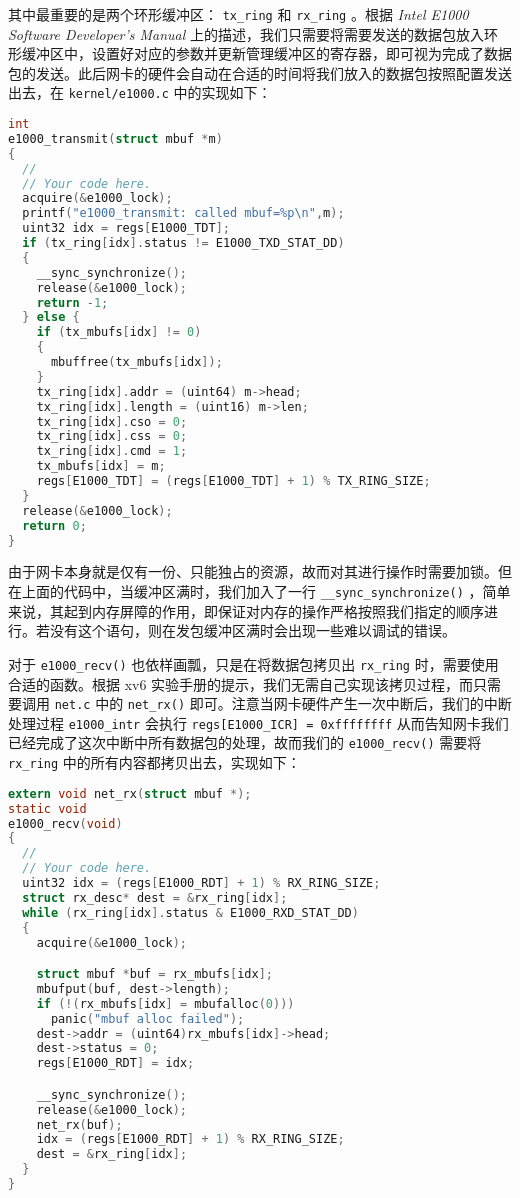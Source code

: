 其中最重要的是两个环形缓冲区： \lstinline{tx_ring} 和 \lstinline{rx_ring} 。根据 \textit{Intel E1000 Software Developer's Manual} 上的描述，我们只需要将需要发送的数据包放入环形缓冲区中，设置好对应的参数并更新管理缓冲区的寄存器，即可视为完成了数据包的发送。此后网卡的硬件会自动在合适的时间将我们放入的数据包按照配置发送出去，在 \lstinline{kernel/e1000.c} 中的实现如下：
\begin{lstlisting}[language=C]
int
e1000_transmit(struct mbuf *m)
{
  //
  // Your code here.
  acquire(&e1000_lock);
  printf("e1000_transmit: called mbuf=%p\n",m);
  uint32 idx = regs[E1000_TDT]; 
  if (tx_ring[idx].status != E1000_TXD_STAT_DD)
  {
    __sync_synchronize();
    release(&e1000_lock);
    return -1;
  } else {
    if (tx_mbufs[idx] != 0)
    {
      mbuffree(tx_mbufs[idx]);
    }
    tx_ring[idx].addr = (uint64) m->head;
    tx_ring[idx].length = (uint16) m->len;
    tx_ring[idx].cso = 0;
    tx_ring[idx].css = 0;
    tx_ring[idx].cmd = 1;
    tx_mbufs[idx] = m;
    regs[E1000_TDT] = (regs[E1000_TDT] + 1) % TX_RING_SIZE;
  }
  release(&e1000_lock);
  return 0;
}
\end{lstlisting}

\begin{theorem}
    由于网卡本身就是仅有一份、只能独占的资源，故而对其进行操作时需要加锁。但在上面的代码中，当缓冲区满时，我们加入了一行 \lstinline{__sync_synchronize()} ，简单来说，其起到内存屏障的作用，即保证对内存的操作严格按照我们指定的顺序进行。若没有这个语句，则在发包缓冲区满时会出现一些难以调试的错误。
\end{theorem}

对于 \lstinline{e1000_recv()} 也依样画瓢，只是在将数据包拷贝出 \lstinline{rx_ring} 时，需要使用合适的函数。根据 xv6 实验手册的提示，我们无需自己实现该拷贝过程，而只需要调用 \lstinline{net.c} 中的 \lstinline{net_rx()} 即可。注意当网卡硬件产生一次中断后，我们的中断处理过程 \lstinline{e1000_intr} 会执行 \lstinline{regs[E1000_ICR] = 0xffffffff} 从而告知网卡我们已经完成了这次中断中所有数据包的处理，故而我们的 \lstinline{e1000_recv()} 需要将 \lstinline{rx_ring} 中的所有内容都拷贝出去，实现如下：
\begin{lstlisting}[language=C]
extern void net_rx(struct mbuf *);
static void
e1000_recv(void)
{
  //
  // Your code here.
  uint32 idx = (regs[E1000_RDT] + 1) % RX_RING_SIZE;
  struct rx_desc* dest = &rx_ring[idx];
  while (rx_ring[idx].status & E1000_RXD_STAT_DD)
  {
    acquire(&e1000_lock);

    struct mbuf *buf = rx_mbufs[idx];
    mbufput(buf, dest->length);
    if (!(rx_mbufs[idx] = mbufalloc(0)))
      panic("mbuf alloc failed");
    dest->addr = (uint64)rx_mbufs[idx]->head;
    dest->status = 0;
    regs[E1000_RDT] = idx;

    __sync_synchronize();
    release(&e1000_lock);
    net_rx(buf);
    idx = (regs[E1000_RDT] + 1) % RX_RING_SIZE;
    dest = &rx_ring[idx];
  }
}
\end{lstlisting}

